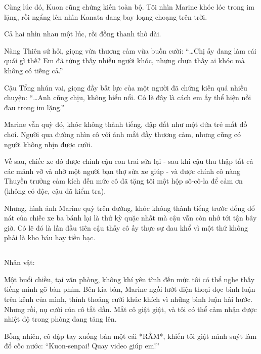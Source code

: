 \documentclass[../main.tex]{subfiles}
\begin{document}
Cùng lúc đó, Kuon cũng chứng kiến toàn bộ. Tôi nhìn Marine khóc lóc trong im lặng, rồi ngẩng lên nhìn Kanata đang bay loạng choạng trên trời.

Cả hai nhìn nhau một lúc, rồi đồng thanh thở dài.

Nàng Thiên sứ hỏi, giọng vừa thương cảm vừa buồn cười: ``\dots  Chị ấy đang làm cái quái gì thế? Em đã từng thấy nhiều người khóc, nhưng chưa thấy ai khóc mà không có tiếng cả.''

Cậu Tổng nhún vai, giọng đầy bất lực của một người đã chứng kiến quá nhiều chuyện: ``\dots  Anh cũng chịu, không hiểu nổi. Có lẽ đây là cách em ấy thể hiện nỗi đau trong im lặng.''

Marine vẫn quỳ đó, khóc không thành tiếng, đập đất như một đứa trẻ mất đồ chơi. Người qua đường nhìn cô với ánh mắt đầy thương cảm, nhưng cũng có người không nhịn được cười.

Về sau, chiếc xe đó được chính cậu con trai sửa lại - sau khi cậu thu thập tất cả các mảnh vỡ và nhờ một người bạn thợ sửa xe giúp - và được chính cô nàng Thuyền trưởng cảm kích đến mức cô đã tặng tôi một hộp sô-cô-la để cảm ơn (không có độc, cậu đã kiểm tra).

Nhưng, hình ảnh Marine quỳ trên đường, khóc không thành tiếng trước đống đổ nát của chiếc xe ba bánh lại là thứ kỳ quặc nhất mà cậu vẫn còn nhớ tới tận bây giờ. Có lẽ đó là lần đầu tiên cậu thấy cô ấy thực sự đau khổ vì một thứ không phải là kho báu hay tiền bạc.

\newpage

\subsection*{\label{ep-S16.VI}}
\vspace{-4pt}
\begin{center}
    {\caviar\fontsize{12pt}{12pt}\selectfont Nhân vật:  }
\end{center}

Một buổi chiều, tại văn phòng, không khí yên tĩnh đến mức tôi có thể nghe thấy tiếng mình gõ bàn phím. Bên kia bàn, Marine ngồi lướt điện thoại đọc bình luận trên kênh của mình, thỉnh thoảng cười khúc khích vì những bình luận hài hước. Nhưng rồi, nụ cười của cô tắt dần. Mắt cô giật giật, và tôi có thể cảm nhận được nhiệt độ trong phòng đang tăng lên.

Bỗng nhiên, cô đập tay xuống bàn một cái *RẦM*, khiến tôi giật mình suýt làm đổ cốc nước: ``Kuon-senpai! Quay video giúp em!''
\end{document}
